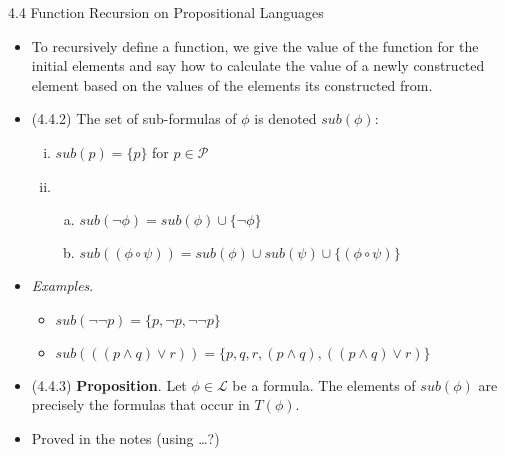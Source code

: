 \documentclass[../slides.tex]{subfiles}
\begin{document}
\begin{frame}{4.4 Function Recursion on Propositional Languages}


	\begin{itemize}
	
 		\item \alert{To recursively define a function, we give the value of the function for the initial elements and say how to calculate the value of a newly constructed element based on the values of the elements its constructed from.}
		
		\item (4.4.2) The set of sub-formulas of $\phi$ is denoted $sub(\phi)$:
		\begin{enumerate}[(i)]
		
			\item $sub(p)=\{p\}$ for $p\in\mathcal{P}$
			
			\item \begin{enumerate}[(a)]
			
				\item $sub(\neg\phi)= sub(\phi)\cup\{\neg \phi\}$
				
				\item $sub((\phi\circ\psi))= sub(\phi)\cup sub(\psi)\cup\{(\phi\circ\psi)\}$
			
			\end{enumerate}
			\end{enumerate}
			
		\item \emph{Examples}.
		
		\begin{itemize}
		
			\item $sub(\neg \neg p)=\{p,\neg p, \neg\neg p\}$
			
			\item $sub(((p\land q)\lor r))=\{p,q,r,(p\land q), ((p\land q)\lor r)\}$
		
		\end{itemize}
		
		\item (4.4.3) \textbf{Proposition}. Let $\phi\in\mathcal{L}$ be a formula. The elements of $sub(\phi)$ are precisely the formulas that occur in $T(\phi)$.
		
		\item Proved in the notes (using \dots?) 
	\end{itemize}

\end{frame}
\end{document}
